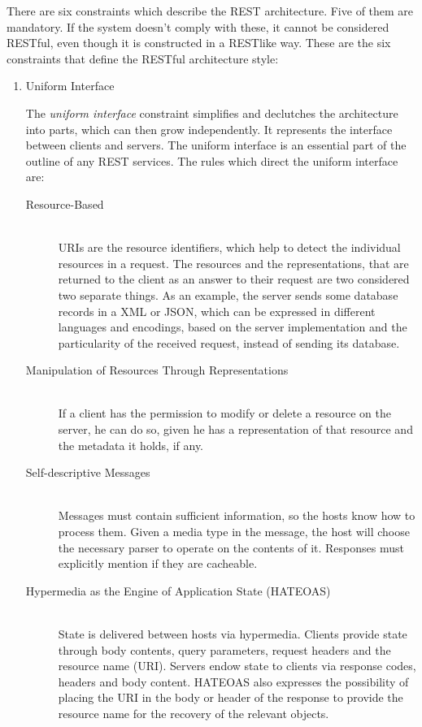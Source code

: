 There are six constraints which describe the REST architecture. Five of them are mandatory. If the system doesn't comply with these, it cannot be considered RESTful, even though it is constructed in a RESTlike way.
These are the six constraints that define the RESTful architecture style:
\begin{enumerate}
  \item Uniform Interface

    The \textit{uniform interface} constraint simplifies and declutches the architecture into parts, which can then grow independently. It represents the interface between clients and servers. The uniform interface is an essential part of the outline of any REST services.  The rules which direct the uniform interface are:

    \begin{description}
      \item[Resource-Based] \hfill \\
        URIs are the resource identifiers, which help to detect the individual resources in a request. The resources and the representations, that are returned to the client as an answer to their request are two considered two separate things. As an example, the server sends some database records in a XML or JSON, which can be expressed in different languages and encodings, based on the server implementation and the particularity of the received request, instead of sending its database.

      \item[Manipulation of Resources Through Representations] \hfill \\
        If a client has the permission to modify or delete a resource on the server, he can do so, given he has a representation of that resource and the metadata it holds, if any.

      \item[Self-descriptive Messages] \hfill \\
        Messages must contain sufficient information, so the hosts know how to process them. Given a media type in the message, the host will choose the necessary parser to operate on the contents of it. Responses must explicitly mention if they are cacheable.

      \item[Hypermedia as the Engine of Application State (HATEOAS)] \hfill \\
        State is delivered between hosts via hypermedia. Clients provide state through body contents, query parameters, request headers and the resource name (URI). Servers endow state to clients via response codes, headers and body content.
        HATEOAS also expresses the possibility of placing the URI in the body or header of the response to provide the resource name for the recovery of the relevant objects.
    \end{description}


\end{enumerate}
